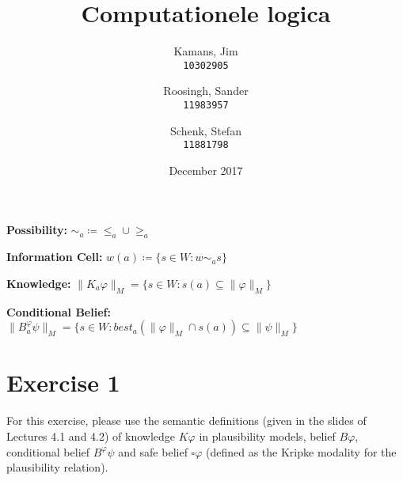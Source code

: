 \documentclass[leqno]{article}
\title{Computationele logica}
\author{
    Kamans, Jim\\
    \texttt{10302905}
    \and
    Roosingh, Sander\\
    \texttt{11983957}
    \and
    Schenk, Stefan\\
    \texttt{11881798}
}
\date{December 2017}
\begin{document}
\maketitle

\textbf{Possibility:} $\sim_a \coloneqq \leq_a \cup \geq_a$

\textbf{Information Cell:} $w(a) \coloneqq \{s\in W:w\sim_a s\}$

\textbf{Knowledge:} $\lVert K_a \varphi \rVert_M = \{s\in W:s(a) \subseteq
\lVert \varphi \rVert_M\}$

\textbf{Conditional Belief:} $\lVert B_a^\varphi \psi \rVert_M = \{s \in
W:best_a(\lVert\varphi\rVert_M \cap s(a)) \subseteq \lVert\psi\rVert_M\}$


\section*{Exercise 1}
For this exercise, please use the semantic definitions (given in the slides of
Lectures 4.1 and 4.2) of knowledge $K\varphi$ in plausibility models, belief
$B\varphi$, conditional belief $B^\varphi \psi$ and safe belief $\square
\varphi$ (defined as the Kripke modality for the plausibility relation).
\end{document}

